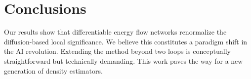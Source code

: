 \section{Conclusions}\label{sec:conclusions}

Our results show that differentiable energy flow networks renormalize
the diffusion-based local significance. We believe this constitutes a
paradigm shift in the AI revolution. Extending the method beyond two
loops is conceptually straightforward but technically demanding. This
work paves the way for a new generation of density estimators.

